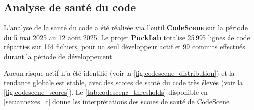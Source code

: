 \subsection{Analyse de santé du code}
L'analyse de la santé du code a été réalisée via l'outil \textbf{CodeScene} sur la période du 5 mai 2025 au 12 août 2025. 
Le projet \textbf{PuckLab} totalise 25\,995 lignes de code réparties sur 164 fichiers, pour un seul développeur actif et 99 commits effectués durant la période de développement.

Aucun risque actif n’a été identifié (voir la \autoref{fig:codescene_distribution}) et la tendance globale est stable, avec des scores de santé du code très élevés (voir la \autoref{fig:codescene_scores}).
Le \autoref{tab:codescene_thresholds} disponible en \autoref{sec:annexes_c} donne les interprétations des scores de santé de CodeScene.

